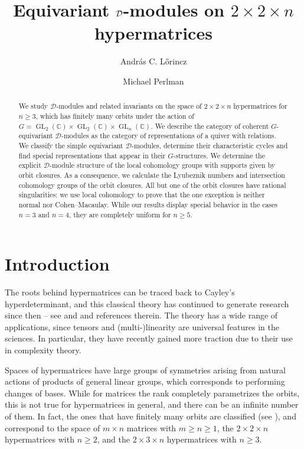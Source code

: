 \documentclass[11pt,reqno]{amsart}
\author{Andr\'{a}s C. L\H{o}rincz}
\author{Michael Perlman}
\title{Equivariant $\D$-modules on $2\times 2\times n$ hypermatrices}
\newcommand{\D}{\mathcal{D}}
\newcommand{\C}{\mathbb{C}}
\newcommand{\GL}{\operatorname{GL}}
\numberwithin{equation}{section}
\begin{document}
\maketitle 

\begin{abstract}
We study $\D$-modules and related invariants on the space of $2\times 2\times n$ hypermatrices for $n\geq 3$, which has finitely many orbits under the action of $G=\GL_2(\C) \times \GL_2(\C) \times \GL_n(\C)$. We describe the category of coherent $G$-equivariant $\D$-modules as the category of representations of a quiver with relations. We classify the simple equivariant $\D$-modules, determine their characteristic cycles and find special representations that appear in their $G$-structures. We determine the explicit $\D$-module structure of the local cohomology groups with supports given by orbit closures. As a consequence, we calculate the Lyubeznik numbers and intersection cohomology groups of the orbit closures. All but one of the orbit closures have rational singularities: we use local cohomology to prove that the one exception is neither normal nor Cohen--Macaulay. While our results display special behavior in the cases $n=3$ and $n=4$, they are completely uniform for $n\geq 5$.
\end{abstract}

\section{Introduction}\label{sec:orbits}

The roots behind hypermatrices can be traced back to Cayley's hyperdeterminant, and this classical theory has continued to generate research since then -- see \cite{gkz} and \cite{landsberg2012tensors} and references therein. The theory has a wide range of applications, since tensors and (multi-)linearity are universal features in the sciences.  In particular, they have recently gained more traction due to their use in complexity theory.

Spaces of hypermatrices have large groups of symmetries arising from natural actions of products of general linear groups, which corresponds to performing changes of bases. While for matrices the rank completely parametrizes the orbits, this is not true for hypermatrices in general, and there can be an infinite number of them. In fact, the ones that have finitely many orbits are classified (see \cite{satokimura, kac}), and correspond to the space of $m\times n$ matrices with $m\geq n \geq 1$, the $2\times 2\times n$  hypermatrices with $n\geq 2$,  and the $2\times 3 \times n$ hypermatrices with $n\geq 3$.
\end{document}
